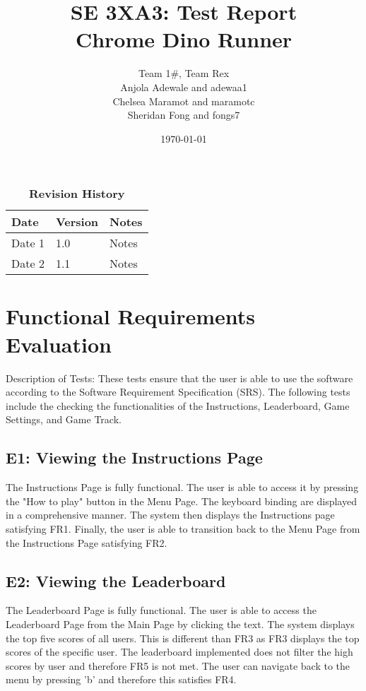 \documentclass[12pt, titlepage]{article}
\title{SE 3XA3: Test Report\\Chrome Dino Runner}
\author{Team 1\#, Team Rex
	\\ Anjola Adewale and adewaa1
	\\ Chelsea Maramot and maramotc
	\\ Sheridan Fong and fongs7
}
\date{\today}
\begin{document}
	
	\maketitle
	
	\tableofcontents
	\listoftables
	\listoffigures
	
	\begin{table}[bp]
		\caption{\bf Revision History}
		\begin{tabularx}{\textwidth}{p{3cm}p{2cm}X}
			\toprule {\bf Date} & {\bf Version} & {\bf Notes}\\
			\midrule
			Date 1 & 1.0 & Notes\\
			Date 2 & 1.1 & Notes\\
			\bottomrule
		\end{tabularx}
	\end{table}
	
	\newpage
	
	
	
	\section{Functional Requirements Evaluation}
	
	Description of Tests: These tests ensure that the user is able to use the software according to the Software Requirement Specification (SRS). The following tests include the checking the functionalities of the Instructions, Leaderboard, Game Settings, and Game Track.
	
	\subsection{E1: Viewing the Instructions Page}
	The Instructions Page is fully functional. The user is able to access it by pressing the "How to play" button in the Menu Page. The keyboard binding are displayed in a comprehensive manner. The system then displays the Instructions page satisfying FR1. Finally, the user is able to transition back to the Menu Page from the Instructions Page satisfying FR2.
	
	\subsection{E2: Viewing the Leaderboard}
	The Leaderboard Page is fully functional. The user is able to access the Leaderboard Page from the Main Page by clicking the text. The system displays the top five scores of all users. This is different than FR3 as FR3 displays the top scores of the specific user. The leaderboard implemented does not filter the high scores by user and therefore FR5 is not met. The user can navigate back to the menu by pressing 'b' and therefore this satisfies FR4. 
	
\end{document}
